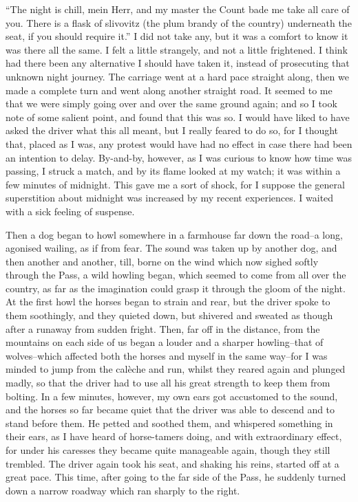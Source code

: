 \documentclass[12pt,openright]{book}
\begin{document}
“The night is chill, mein Herr, and my master the Count bade me take all care of you. There is a flask of slivovitz (the plum brandy of the country) underneath the seat, if you should require it.” I did not take any, but it was a comfort to know it was there all the same. I felt a little strangely, and not a little frightened. I think had there been any alternative I should have taken it, instead of prosecuting that unknown night journey. The carriage went at a hard pace straight along, then we made a complete turn and went along another straight road. It seemed to me that we were simply going over and over the same ground again; and so I took note of some salient point, and found that this was so. I would have liked to have asked the driver what this all meant, but I really feared to do so, for I thought that, placed as I was, any protest would have had no effect in case there had been an intention to delay. By-and-by, however, as I was curious to know how time was passing, I struck a match, and by its flame looked at my watch; it was within a few minutes of midnight. This gave me a sort of shock, for I suppose the general superstition about midnight was increased by my recent experiences. I waited with a sick feeling of suspense.

Then a dog began to howl somewhere in a farmhouse far down the road–a long, agonised wailing, as if from fear. The sound was taken up by another dog, and then another and another, till, borne on the wind which now sighed softly through the Pass, a wild howling began, which seemed to come from all over the country, as far as the imagination could grasp it through the gloom of the night. At the first howl the horses began to strain and rear, but the driver spoke to them soothingly, and they quieted down, but shivered and sweated as though after a runaway from sudden fright. Then, far off in the distance, from the mountains on each side of us began a louder and a sharper howling–that of wolves–which affected both the horses and myself in the same way–for I was minded to jump from the calèche and run, whilst they reared again and plunged madly, so that the driver had to use all his great strength to keep them from bolting. In a few minutes, however, my own ears got accustomed to the sound, and the horses so far became quiet that the driver was able to descend and to stand before them. He petted and soothed them, and whispered something in their ears, as I have heard of horse-tamers doing, and with extraordinary effect, for under his caresses they became quite manageable again, though they still trembled. The driver again took his seat, and shaking his reins, started off at a great pace. This time, after going to the far side of the Pass, he suddenly turned down a narrow roadway which ran sharply to the right.
\end{document}
